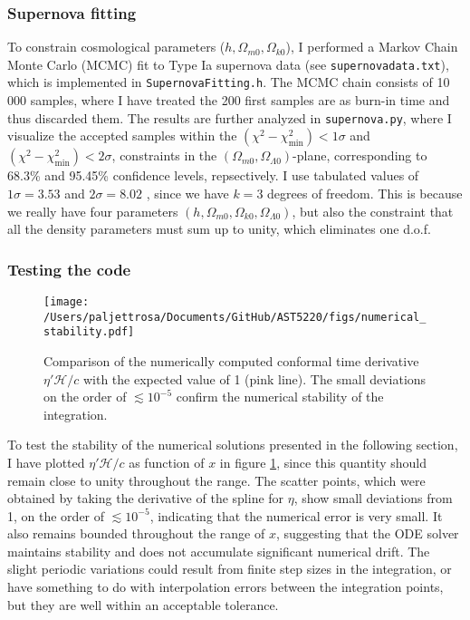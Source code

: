 \documentclass{aa}
\numberwithin{equation}{section}
\numberwithin{table}{section}
\numberwithin{figure}{section}
\begin{document}
\subsubsection{Supernova fitting}
To constrain cosmological parameters ($h, \Omega_{m0}, \Omega_{k0}$), I performed a Markov Chain Monte Carlo (MCMC) fit to Type Ia supernova data (see \verb|supernovadata.txt|), which is implemented in \verb|SupernovaFitting.h|. The MCMC chain consists of 10$\,$000 samples, where I have treated the 200 first samples are as burn-in time and thus discarded them. The results are further analyzed in \verb|supernova.py|, where I visualize the accepted samples within the $(\chi^2-\chi^2_\text{min})<1\sigma$ and $(\chi^2-\chi^2_\text{min})<2\sigma$, constraints in the $(\Omega_{m0},\Omega_{\Lambda0})$-plane, corresponding to 68.3\% and 95.45\% confidence levels, repsectively. I use tabulated values of $1\sigma=3.53$ and $2\sigma=8.02$ \citep[see][]{Chi2}, since we have $k=3$ degrees of freedom. This is because we really have four parameters $(h, \Omega_{m0}, \Omega_{k0}, \Omega_{\Lambda0})$, but also the constraint that all the density parameters must sum up to unity, which eliminates one d.o.f. 

\subsubsection{Testing the code}\label{subsubsec: I methods testing}
\begin{figure}
    \centering
    \texttt{[image: /Users/paljettrosa/Documents/GitHub/AST5220/figs/numerical\_stability.pdf]}
    \caption{Comparison of the numerically computed conformal time derivative  $\eta'\mathcal{H}/c$ with the expected value of 1 (pink line). The small deviations on the order of $\lesssim 10^{-5}$ confirm the numerical stability of the integration.}\label{fig:numerical stability}
\end{figure}

To test the stability of the numerical solutions presented in the following section, I have plotted $\eta'\mathcal{H}/c$ as function of $x$ in figure \ref{fig:numerical stability}, since this quantity should remain close to unity throughout the range. The scatter points, which were obtained by taking the derivative of the spline for $\eta$, show small deviations from 1, on the order of $\lesssim 10^{-5}$, indicating that the numerical error is very small. It also remains bounded throughout the range of $x$, suggesting that the ODE solver maintains stability and does not accumulate significant numerical drift. The slight periodic variations could result from finite step sizes in the integration, or have something to do with interpolation errors between the integration points, but they are well within an acceptable tolerance.
\end{document}
